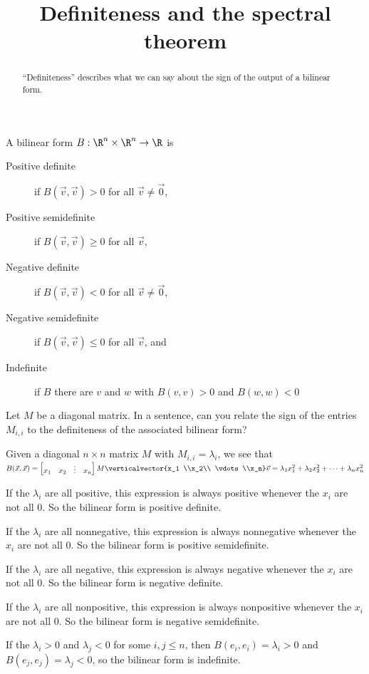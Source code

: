 \documentclass{ximera}
\title{Definiteness and the spectral theorem}
\begin{document}
\begin{abstract}
  ``Definiteness'' describes what we can say about the sign of the output of a bilinear form.
\end{abstract}

\begin{definition}
  A bilinear form $B : \R^n \times \R^n \to \R$ is
  \begin{description}
  \item[Positive definite] if $B(\vec{v},\vec{v}) > 0 $ for all $\vec{v} \neq \vec{0}$,
  \item[Positive semidefinite] if $B(\vec{v},\vec{v}) \geq 0 $ for all $\vec{v}$,
  \item[Negative definite] if $B(\vec{v},\vec{v}) < 0 $ for all $\vec{v} \neq \vec{0}$,
  \item[Negative semidefinite] if $B(\vec{v},\vec{v}) \leq 0 $ for all $\vec{v}$, and
  \item[Indefinite] if $B$ there are $v$ and $w$ with $B(v,v)>0$ and $B(w,w)<0$
  \end{description}
\end{definition}

Let $M$ be a diagonal matrix.  In a sentence, can you relate the sign of the entries $M_{i,i}$ to the definiteness of the associated bilinear form? 
	
\begin{free-response}
  Given a diagonal $n \times n$ matrix $M$ with $M_{i,i} = \lambda_i$, we see that 
  \(
  B(\vec{x},\vec{x}) = \begin{bmatrix} x_1 & x_2 & \vdots & x_n\end{bmatrix} M  \verticalvector{x_1 \\x_2\\ \vdots \\x_n}\vec{v} = \lambda_1x_1^2 +\lambda_2x_2^2+ \cdots +\lambda_nx_n^2
  \)
  
  If the $\lambda_i$ are all positive, this expression is always positive whenever the $x_i$ are not all $0$.  So the bilinear form is positive definite.
  
  If the $\lambda_i$ are all nonnegative, this expression is always nonnegative whenever the $x_i$ are not all $0$.  So the bilinear form is positive semidefinite.
  
  If the $\lambda_i$ are all negative, this expression is always negative whenever the $x_i$ are not all $0$.  So the bilinear form is negative definite.
  
  If the $\lambda_i$ are all nonpositive, this expression is always nonpositive whenever the $x_i$ are not all $0$.  So the bilinear form is negative  semidefinite.
  
  If the $\lambda_i>0$ and $\lambda_j<0$  for some $i,j\leq n$, then $B(e_i,e_i) = \lambda_i >0$ and $B(e_j,e_j) = \lambda_j <0$, so the bilinear form 
  is indefinite. 
  
\end{free-response}
\end{document}
